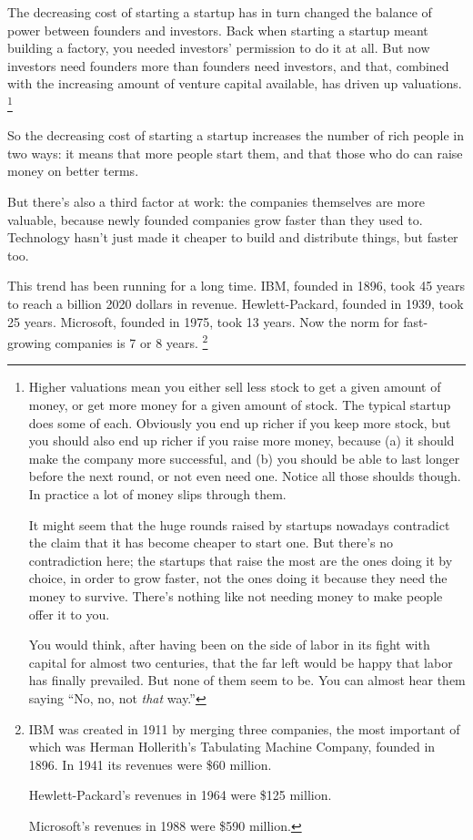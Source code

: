 \documentclass[12pt]{book}
\begin{document}
The decreasing cost of starting a startup has in turn changed the
balance of power between founders and investors. Back when starting a
startup meant building a factory, you needed investors' permission to do
it at all. But now investors need founders more than founders need
investors, and that, combined with the increasing amount of venture
capital available, has driven up valuations. \footnote{Higher valuations mean you either sell less stock to get a given
amount of money, or get more money for a given amount of stock. The
typical startup does some of each. Obviously you end up richer if you
keep more stock, but you should also end up richer if you raise more
money, because (a) it should make the company more successful, and (b)
you should be able to last longer before the next round, or not even
need one. Notice all those shoulds though. In practice a lot of money
slips through them.

It might seem that the huge rounds raised by startups nowadays
contradict the claim that it has become cheaper to start one. But
there's no contradiction here; the startups that raise the most are the
ones doing it by choice, in order to grow faster, not the ones doing it
because they need the money to survive. There's nothing like not needing
money to make people offer it to you.

You would think, after having been on the side of labor in its fight
with capital for almost two centuries, that the far left would be happy
that labor has finally prevailed. But none of them seem to be. You can
almost hear them saying ``No, no, not \emph{that} way.''}

So the decreasing cost of starting a startup increases the number of
rich people in two ways: it means that more people start them, and that
those who do can raise money on better terms.

But there's also a third factor at work: the companies themselves are
more valuable, because newly founded companies grow faster than they
used to. Technology hasn't just made it cheaper to build and distribute
things, but faster too.

This trend has been running for a long time. IBM, founded in 1896, took
45 years to reach a billion 2020 dollars in revenue. Hewlett-Packard,
founded in 1939, took 25 years. Microsoft, founded in 1975, took 13
years. Now the norm for fast-growing companies is 7 or 8 years.
\footnote{IBM was created in 1911 by merging three companies, the most
important of which was Herman Hollerith's Tabulating Machine Company,
founded in 1896. In 1941 its revenues were \$60 million.

Hewlett-Packard's revenues in 1964 were \$125 million.

Microsoft's revenues in 1988 were \$590 million.}
\end{document}
